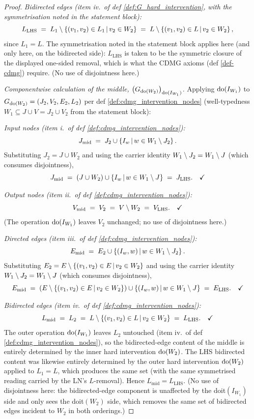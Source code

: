 \documentclass[main]{subfiles}
\begin{document}
\begin{proof}
\medskip\noindent\emph{Bidirected edges (item iv.\ of def \ref{def:G_hard_intervention}, with the symmetrisation noted in the statement block):}
\[
    L_{\mathrm{LHS}} \;=\; L_1 \setminus \left \{ (v_1, v_2) \in L_1 \,\middle|\, v_2 \in W_2 \right \} \;=\; L \setminus \left \{ (v_1, v_2) \in L \,\middle|\, v_2 \in W_2 \right \},
\]
since $L_1 = L$. The symmetrisation noted in the statement block applies here (and only here, on the bidirected side): $L_{\mathrm{LHS}}$ is taken to be the symmetric closure of the displayed one-sided removal, which is what the CDMG axioms (def \ref{def-cdmg}) require. (No use of disjointness here.)

\smallskip\noindent\emph{Componentwise calculation of the middle, $\left ( G_{\operatorname{do}(W_2)} \right )_{\operatorname{do}(I_{W_1})}$.}
Applying $\operatorname{do}(I_{W_1})$ to $G_{\operatorname{do}(W_2)} = (J_2, V_2, E_2, L_2)$ per def \ref{def:cdmg_intervention_nodes} (well-typedness $W_1 \subseteq J \cup V = J_2 \cup V_2$ from the statement block):

\medskip\noindent\emph{Input nodes (item i.\ of def \ref{def:cdmg_intervention_nodes}):}
\[
    J_{\mathrm{mid}} \;=\; J_2 \cup \left \{ I_w \,\middle|\, w \in W_1 \setminus J_2 \right \}.
\]
Substituting $J_2 = J \cup W_2$ and using the carrier identity $W_1 \setminus J_2 = W_1 \setminus J$ (which consumes disjointness),
\[
    J_{\mathrm{mid}} \;=\; (J \cup W_2) \cup \left \{ I_w \,\middle|\, w \in W_1 \setminus J \right \} \;=\; J_{\mathrm{LHS}}. \quad \checkmark
\]

\medskip\noindent\emph{Output nodes (item ii.\ of def \ref{def:cdmg_intervention_nodes}):}
\[
    V_{\mathrm{mid}} \;=\; V_2 \;=\; V \setminus W_2 \;=\; V_{\mathrm{LHS}}. \quad \checkmark
\]
(The operation $\operatorname{do}(I_{W_1})$ leaves $V_2$ unchanged; no use of disjointness here.)

\medskip\noindent\emph{Directed edges (item iii.\ of def \ref{def:cdmg_intervention_nodes}):}
\[
    E_{\mathrm{mid}} \;=\; E_2 \cup \left \{ (I_w, w) \,\middle|\, w \in W_1 \setminus J_2 \right \}.
\]
Substituting $E_2 = E \setminus \left \{ (v_1, v_2) \in E \,\middle|\, v_2 \in W_2 \right \}$ and using the carrier identity $W_1 \setminus J_2 = W_1 \setminus J$ (which consumes disjointness),
\[
    E_{\mathrm{mid}} \;=\; \left ( E \setminus \left \{ (v_1, v_2) \in E \,\middle|\, v_2 \in W_2 \right \} \right ) \cup \left \{ (I_w, w) \,\middle|\, w \in W_1 \setminus J \right \} \;=\; E_{\mathrm{LHS}}. \quad \checkmark
\]

\medskip\noindent\emph{Bidirected edges (item iv.\ of def \ref{def:cdmg_intervention_nodes}):}
\[
    L_{\mathrm{mid}} \;=\; L_2 \;=\; L \setminus \left \{ (v_1, v_2) \in L \,\middle|\, v_2 \in W_2 \right \} \;=\; L_{\mathrm{LHS}}. \quad \checkmark
\]
The outer operation $\operatorname{do}(I_{W_1})$ leaves $L_2$ untouched (item iv.\ of def \ref{def:cdmg_intervention_nodes}), so the bidirected-edge content of the middle is entirely determined by the inner hard intervention $\operatorname{do}(W_2)$. The LHS bidirected content was likewise entirely determined by the outer hard intervention $\operatorname{do}(W_2)$ applied to $L_1 = L$, which produces the same set (with the same symmetrised reading carried by the LN's $L$-removal). Hence $L_{\mathrm{mid}} = L_{\mathrm{LHS}}$. (No use of disjointness here: the bidirected-edge component is unaffected by the doit$(I_{W_1})$ side and only sees the doit$(W_2)$ side, which removes the same set of bidirected edges incident to $W_2$ in both orderings.)


\end{proof}
\end{document}
